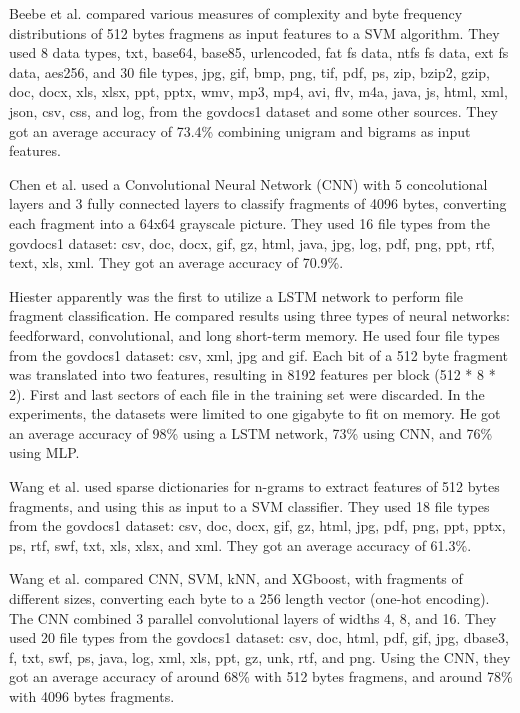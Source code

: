 Beebe et al. \cite{beebe_sceadan:_2013}
compared various measures of complexity and byte frequency distributions of 512 bytes fragmens as input features to a SVM algorithm.
They used 8 data types, txt, base64, base85, urlencoded, fat fs data, ntfs fs data, ext fs data, aes256, and
30 file types, jpg, gif, bmp, png, tif, pdf, ps, zip, bzip2, gzip, doc, docx, xls, xlsx, ppt, pptx, wmv, mp3, mp4, avi, flv, m4a, java, js, html, xml, json, csv, css, and log, from the govdocs1 dataset and some other sources.
They got an average accuracy of 73.4\% combining unigram and bigrams as input features.

Chen et al. \cite{chen_file_2018}
used a Convolutional Neural Network (CNN) with 5 concolutional layers and 3 fully connected layers to classify fragments of 4096 bytes, converting each fragment into a 64x64 grayscale picture.
They used 16 file types from the govdocs1 dataset: csv, doc, docx, gif, gz, html, java, jpg, log, pdf, png, ppt, rtf, text, xls, xml.
They got an average accuracy of 70.9\%.

Hiester \cite{hiester_file_2018} apparently was the first to utilize a LSTM network to perform file fragment classification. He compared results using three types of neural networks: feedforward, convolutional, and long short-term memory. He used four file types from the govdocs1 dataset: csv, xml, jpg and gif. Each bit of a 512 byte fragment was translated into two features, resulting in 8192 features per block (512 * 8 * 2). First and last sectors of each file in the training set were discarded. In the experiments, the datasets were limited to one gigabyte to fit on memory. He got an average accuracy of 98\% using a LSTM network, 73\% using CNN, and 76\% using MLP.

Wang et al. \cite{wang_sparse_2018} 
used sparse dictionaries for n-grams to extract features of 512 bytes fragments, and using this as input to a SVM classifier.
They used 18 file types from the govdocs1 dataset: csv, doc, docx, gif, gz, html, jpg, pdf, png, ppt, pptx, ps, rtf, swf, txt, xls, xlsx, and xml.
They got an average accuracy of 61.3\%.

Wang et al. \cite{wang_file_2018}  
compared CNN, SVM, kNN, and XGboost, with fragments of different sizes, converting each byte to a 256 length vector (one-hot encoding). The CNN combined 3 parallel convolutional layers of widths 4, 8, and 16.
They used 20 file types from the govdocs1 dataset: csv, doc, html, pdf, gif, jpg, dbase3, f, txt, swf, ps, java, log, xml, xls, ppt, gz, unk, rtf, and png.
Using the CNN, they got an average accuracy of around 68\% with 512 bytes fragmens, and around 78\% with 4096 bytes fragments.

